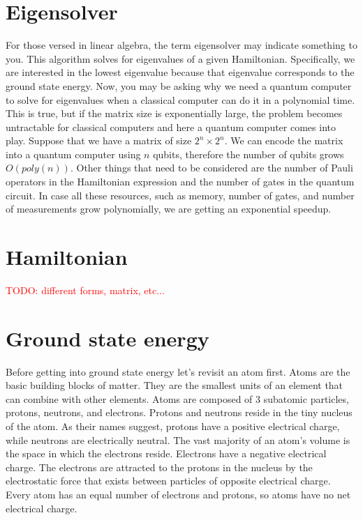 \section{Eigensolver}
For those versed in linear algebra, the term eigensolver may indicate something to you. This algorithm solves for eigenvalues of a given Hamiltonian. Specifically, we are interested in the lowest eigenvalue because that eigenvalue corresponds to the ground state energy. Now, you may be asking why we need a quantum computer to solve for eigenvalues when a classical computer can do it in a polynomial time. This is true, but if the matrix size is exponentially large, the problem becomes untractable for classical computers and here a quantum computer comes into play. Suppose that we have a matrix of size $2^n \times 2^n$. We can encode the matrix into a quantum computer using $n$ qubits, therefore the number of qubits grows $O(poly(n))$. Other things that need to be considered are the number of Pauli operators in the Hamiltonian expression and the number of gates in the quantum circuit. In case all these resources, such as memory, number of gates, and number of measurements grow polynomially, we are getting an exponential speedup.

\section{Hamiltonian}
\textcolor{red}{TODO: different forms, matrix, etc...}

\section{Ground state energy}
Before getting into ground state energy let's revisit an atom first. Atoms are the basic building blocks of
matter. They are the smallest units of an element that can combine with other elements. Atoms are composed of 3 subatomic particles, protons, neutrons, and electrons. Protons and neutrons reside in the tiny nucleus of the atom. As their names suggest, protons have a positive electrical charge, while neutrons are electrically neutral. The vast majority of an atom's volume is the space in which the electrons reside. Electrons have a negative electrical charge. The electrons are attracted to the protons in the nucleus by the electrostatic force that exists between particles of opposite electrical charge. Every atom has an equal number of electrons
and protons, so atoms have no net electrical charge.


